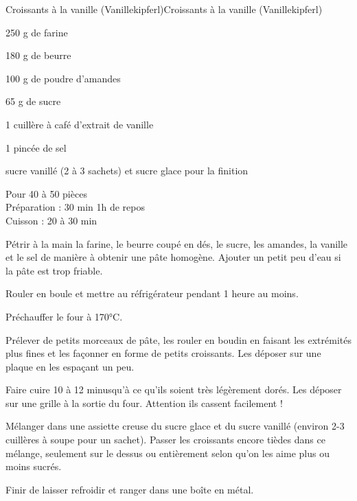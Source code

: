 \begin{recette}{Croissants à la vanille (Vanillekipferl)}{Croissants à la vanille (Vanillekipferl)}

\begin{ingredients}
250 g de farine\par
180 g de beurre\par
100 g de poudre d'amandes\par
65 g de sucre\par
1 cuillère à café d'extrait de vanille\par
1 pincée de sel\par
sucre vanillé (2 à 3 sachets) et sucre glace pour la finition\par
\end{ingredients}

\begin{infos}
Pour 40 à 50 pièces\\
Préparation : 30 min 1h de repos\\
Cuisson : 20 à 30 min\\
\end{infos}

\begin{etapes}
\item Pétrir à la main la farine, le beurre coupé en dés, le sucre, les amandes, la vanille et le sel de manière à obtenir une pâte homogène. Ajouter un petit peu d'eau si la pâte est trop friable.
\item Rouler en boule et mettre au réfrigérateur pendant 1 heure au moins.
\item Préchauffer le four à 170°C.
\item Prélever de petits morceaux de pâte, les rouler en boudin en faisant les extrémités plus fines et les façonner en forme de petits croissants. Les déposer sur une plaque en les espaçant un peu.
\item Faire cuire 10 à 12 minusqu'à ce qu'ils soient très légèrement dorés. Les déposer sur une grille à la sortie du four. Attention ils cassent facilement !
\item Mélanger dans une assiette creuse du sucre glace et du sucre vanillé (environ 2-3 cuillères à soupe pour un sachet). Passer les croissants encore tièdes dans ce mélange, seulement sur le dessus ou entièrement selon qu'on les aime plus ou moins sucrés.
\item Finir de laisser refroidir et ranger dans une boîte en métal.
\end{etapes}

\end{recette}
